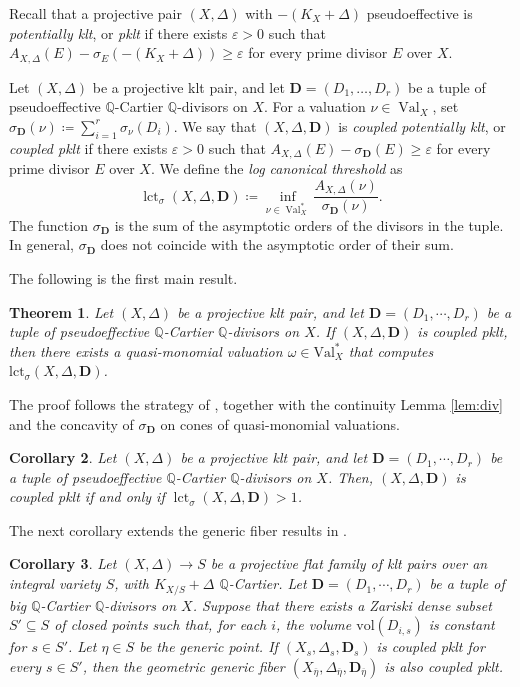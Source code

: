 \documentclass[a4paper,12pt]{amsart}
\newtheorem{theorem}{Theorem}[section]
\theoremstyle{plain}
\newtheorem{corollary}[theorem]{Corollary}
\theoremstyle{definition}
\numberwithin{equation}{section}
\newcommand{\Q}{\mathbb{Q}}
\DeclareMathOperator{\Val}{Val}
\def\lct{\operatorname{lct}}
\begin{document}
Recall that a projective pair $(X,\Delta)$ with $-(K_X+\Delta)$ pseudoeffective is \emph{potentially klt}, or \emph{pklt} if there exists $\varepsilon>0$ such that $A_{X,\Delta}(E)-\sigma_E(-(K_X+\Delta))\geq \varepsilon$ for every prime divisor $E$ over $X$.

Let $(X,\Delta)$ be a projective klt pair, and let \(\mathbf{D}=(D_1,\dots,D_r)\) be a tuple of pseudoeffective \(\Q\)-Cartier \(\Q\)-divisors on $X$. For a valuation \(\nu\in \Val_X\), set $\sigma_{\mathbf{D}}(\nu)\coloneqq \sum_{i=1}^r \sigma_{\nu}(D_i)$. We say that \((X,\Delta,\mathbf{D})\) is \emph{coupled potentially klt}, or \emph{coupled pklt} if there exists \(\varepsilon>0\) such that $A_{X,\Delta}(E)-\sigma_{\mathbf{D}}(E)\geq \varepsilon$ for every prime divisor \(E\) over \(X\). We define the \emph{log canonical threshold} as
\[
\lct_{\sigma}(X,\Delta,\mathbf{D})\coloneqq \inf_{\nu\in \Val^{\ast}_X}\frac{A_{X,\Delta}(\nu)}{\sigma_{\mathbf{D}}(\nu)}.
\]
The function $\sigma_{\mathbf{D}}$ is the sum of the asymptotic orders of the divisors in the tuple. In general, $\sigma_{\mathbf{D}}$ does not coincide with the asymptotic order of their sum.

The following is the first main result.

\begin{theorem} \label{thrm:1}
Let $(X,\Delta)$ be a projective klt pair, and let $\mathbf D=(D_1,\cdots,D_r)$ be a tuple of pseudoeffective $\Q$-Cartier $\Q$-divisors on $X$. If \((X,\Delta,\mathbf D)\) is coupled pklt, then there exists a quasi-monomial valuation $\omega\in \mathrm{Val}^*_X$ that computes $\mathrm{lct}_{\sigma}(X,\Delta,\mathbf D)$.
\end{theorem}

The proof follows the strategy of \cite[Theorem 1.1]{CJKL}, together with the continuity  Lemma \ref{lem:div} and the concavity of $\sigma_{\mathbf D}$ on cones of quasi-monomial valuations.

\begin{corollary}\label{coro}
Let $(X,\Delta)$ be a projective klt pair, and let $\mathbf D=(D_1,\cdots,D_r)$ be a tuple of pseudoeffective $\Q$-Cartier $\Q$-divisors on $X$. Then, $(X,\Delta,\mathbf D)$ is coupled pklt if and only if $\lct_{\sigma}(X,\Delta,\mathbf D)>1$.
\end{corollary}

The next corollary extends the generic fiber results in \cite[Theorem 1.2]{Kim25}.

\begin{corollary}\label{coro2}
Let $(X,\Delta)\to S$ be a projective flat family of klt pairs over an integral variety $S$, with $K_{X/S}+\Delta$ $\Q$-Cartier. Let $\mathbf D=(D_1,\cdots,D_r)$ be a tuple of big $\Q$-Cartier $\Q$-divisors on $X$. Suppose that there exists a Zariski dense subset $S'\subseteq S$ of closed points such that, for each $i$, the volume $\mathrm{vol}(D_{i,s})$ is constant for $s\in S'$. Let $\eta\in S$ be the generic point. If $(X_s,\Delta_s,\mathbf D_s)$ is coupled pklt for every $s\in S'$, then the geometric generic fiber $(X_{\overline{\eta}},\Delta_{\overline{\eta}},\mathbf D_{\overline{\eta}})$ is also coupled pklt.
\end{corollary}
\end{document}
